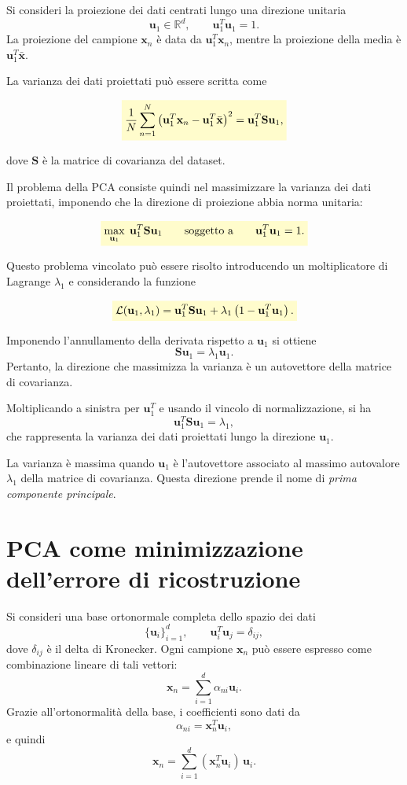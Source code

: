 \documentclass[a4paper,12pt]{report}
\newcommand{\highlight}[1]{%
\colorbox{yellow!20}{$\displaystyle #1$}%
}
\begin{document}
Si consideri la proiezione dei dati centrati lungo una direzione unitaria
\[
\mathbf{u}_1 \in \mathbb{R}^d, \qquad \mathbf{u}_1^T \mathbf{u}_1 = 1.
\]
La proiezione del campione $\mathbf{x}_n$ è data da $\mathbf{u}_1^T \mathbf{x}_n$, mentre la proiezione della media è $\mathbf{u}_1^T \bar{\mathbf{x}}$.

La varianza dei dati proiettati può essere scritta come

\[
\highlight{
\frac{1}{N} \sum_{n=1}^{N} \left( \mathbf{u}_1^T \mathbf{x}_n - \mathbf{u}_1^T \bar{\mathbf{x}} \right)^2
= \mathbf{u}_1^T \mathbf{S} \mathbf{u}_1,}
\]

dove $\mathbf{S}$ è la matrice di covarianza del dataset.

Il problema della PCA consiste quindi nel massimizzare la varianza dei dati proiettati, imponendo che la direzione di proiezione 
abbia norma unitaria:

\[
\highlight{
\max_{\mathbf{u}_1} \; \mathbf{u}_1^T \mathbf{S} \mathbf{u}_1
\qquad \text{soggetto a} \qquad
\mathbf{u}_1^T \mathbf{u}_1 = 1.}
\]

Questo problema vincolato può essere risolto introducendo un moltiplicatore di Lagrange $\lambda_1$ e considerando la funzione

\[
\highlight{
\mathcal{L}(\mathbf{u}_1, \lambda_1)
= \mathbf{u}_1^T \mathbf{S} \mathbf{u}_1
+ \lambda_1 \left( 1 - \mathbf{u}_1^T \mathbf{u}_1 \right).}
\]

Imponendo l'annullamento della derivata rispetto a $\mathbf{u}_1$ si ottiene
\[
\mathbf{S} \mathbf{u}_1 = \lambda_1 \mathbf{u}_1.
\]
Pertanto, la direzione che massimizza la varianza è un autovettore della matrice di covarianza.

Moltiplicando a sinistra per $\mathbf{u}_1^T$ e usando il vincolo di normalizzazione, si ha
\[
\mathbf{u}_1^T \mathbf{S} \mathbf{u}_1 = \lambda_1,
\]
che rappresenta la varianza dei dati proiettati lungo la direzione $\mathbf{u}_1$.

La varianza è massima quando $\mathbf{u}_1$ è l'autovettore associato al massimo autovalore $\lambda_1$ della matrice di covarianza.
Questa direzione prende il nome di \emph{prima componente principale}.

\section{PCA come minimizzazione dell'errore di ricostruzione}

Si consideri una base ortonormale completa dello spazio dei dati
\[
\{ \mathbf{u}_i \}_{i=1}^{d}, \qquad \mathbf{u}_i^T \mathbf{u}_j = \delta_{ij},
\]
dove $\delta_{ij}$ è il delta di Kronecker. Ogni campione $\mathbf{x}_n$ può essere espresso come combinazione lineare di tali vettori:
\[
\mathbf{x}_n = \sum_{i=1}^{d} \alpha_{ni} \mathbf{u}_i.
\]
Grazie all'ortonormalità della base, i coefficienti sono dati da
\[
\alpha_{ni} = \mathbf{x}_n^T \mathbf{u}_i,
\]
e quindi
\[
\mathbf{x}_n = \sum_{i=1}^{d} (\mathbf{x}_n^T \mathbf{u}_i)\,\mathbf{u}_i.
\]
\end{document}
